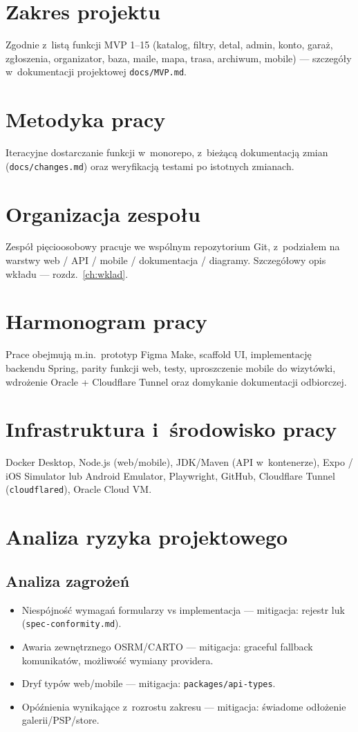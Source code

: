 \documentclass{sprz}
\begin{document}
\section{Zakres projektu}  
Zgodnie z~listą funkcji MVP 1--15 (katalog, filtry, detal, admin, konto, garaż, zgłoszenia, organizator, baza, maile, mapa, trasa, archiwum, mobile) --- szczegóły w~dokumentacji projektowej \texttt{docs/MVP.md}.  
  
\section{Metodyka pracy}  
Iteracyjne dostarczanie funkcji w~monorepo, z~bieżącą dokumentacją zmian (\texttt{docs/changes.md}) oraz weryfikacją testami po istotnych zmianach.  
  
\section{Organizacja zespołu}  
Zespół pięcioosobowy pracuje we wspólnym repozytorium Git, z~podziałem na warstwy web / API / mobile / dokumentacja / diagramy. Szczegółowy opis wkładu --- rozdz.~\ref{ch:wklad}.  
  
\section{Harmonogram pracy}  
Prace obejmują m.in.\ prototyp Figma Make, scaffold UI, implementację backendu Spring, parity funkcji web, testy, uproszczenie mobile do wizytówki, wdrożenie Oracle + Cloudflare Tunnel oraz domykanie dokumentacji odbiorczej.  
  
\section{Infrastruktura i~środowisko pracy}  
Docker Desktop, Node.js (web/mobile), JDK/Maven (API w~kontenerze), Expo / iOS Simulator lub Android Emulator, Playwright, GitHub, Cloudflare Tunnel (\texttt{cloudflared}), Oracle Cloud VM.  
  
\section{Analiza ryzyka projektowego}  
\subsection{Analiza zagrożeń}  
\begin{itemize}  
 \item Niespójność wymagań formularzy vs implementacja --- mitigacja: rejestr luk (\texttt{spec-conformity.md}).  
 \item Awaria zewnętrznego OSRM/CARTO --- mitigacja: graceful fallback komunikatów, możliwość wymiany providera.  
 \item Dryf typów web/mobile --- mitigacja: \texttt{packages/api-types}.  
 \item Opóźnienia wynikające z~rozrostu zakresu --- mitigacja: świadome odłożenie galerii/PSP/store.  
\end{itemize}  
  
\end{document}
